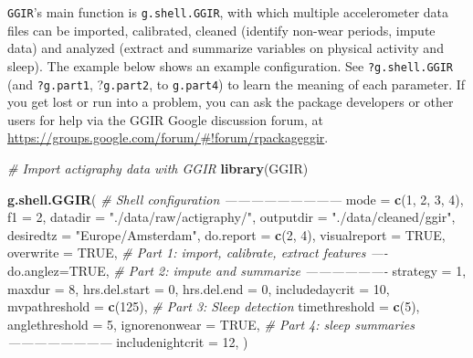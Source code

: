 \documentclass[]{book}
\newenvironment{Shaded}{\begin{snugshade}}{\end{snugshade}}
\newcommand{\KeywordTok}[1]{\textcolor[rgb]{0.13,0.29,0.53}{\textbf{#1}}}
\newcommand{\DataTypeTok}[1]{\textcolor[rgb]{0.13,0.29,0.53}{#1}}
\newcommand{\DecValTok}[1]{\textcolor[rgb]{0.00,0.00,0.81}{#1}}
\newcommand{\StringTok}[1]{\textcolor[rgb]{0.31,0.60,0.02}{#1}}
\newcommand{\CommentTok}[1]{\textcolor[rgb]{0.56,0.35,0.01}{\textit{#1}}}
\newcommand{\OtherTok}[1]{\textcolor[rgb]{0.56,0.35,0.01}{#1}}
\newcommand{\NormalTok}[1]{#1}
\begin{document}
\texttt{GGIR}'s main function is \texttt{g.shell.GGIR}, with which
multiple accelerometer data files can be imported, calibrated, cleaned
(identify non-wear periods, impute data) and analyzed (extract and
summarize variables on physical activity and sleep). The example below
shows an example configuration. See \texttt{?g.shell.GGIR} (and
\texttt{?g.part1}, ?\texttt{g.part2}, to \texttt{g.part4}) to learn the
meaning of each parameter. If you get lost or run into a problem, you
can ask the package developers or other users for help via the GGIR
Google discussion forum, at
\url{https://groups.google.com/forum/\#!forum/rpackageggir}.

\begin{Shaded}
\begin{Highlighting}[]
\CommentTok{# Import actigraphy data with GGIR}
\KeywordTok{library}\NormalTok{(GGIR)}

\KeywordTok{g.shell.GGIR}\NormalTok{(}
  \CommentTok{# Shell configuration ---------------------------}
  \DataTypeTok{mode =} \KeywordTok{c}\NormalTok{(}\DecValTok{1}\NormalTok{, }\DecValTok{2}\NormalTok{, }\DecValTok{3}\NormalTok{, }\DecValTok{4}\NormalTok{), }\DataTypeTok{f1 =} \DecValTok{2}\NormalTok{,}
  \DataTypeTok{datadir =} \StringTok{"./data/raw/actigraphy/"}\NormalTok{, }
  \DataTypeTok{outputdir =} \StringTok{"./data/cleaned/ggir"}\NormalTok{,}
  \DataTypeTok{desiredtz =} \StringTok{"Europe/Amsterdam"}\NormalTok{,}
  \DataTypeTok{do.report =} \KeywordTok{c}\NormalTok{(}\DecValTok{2}\NormalTok{, }\DecValTok{4}\NormalTok{), }\DataTypeTok{visualreport =} \OtherTok{TRUE}\NormalTok{,}
  \DataTypeTok{overwrite =} \OtherTok{TRUE}\NormalTok{,}
  \CommentTok{# Part 1: import, calibrate, extract features ----}
  \DataTypeTok{do.anglez=}\OtherTok{TRUE}\NormalTok{,}
  \CommentTok{# Part 2: impute and summarize -------------------}
  \DataTypeTok{strategy =} \DecValTok{1}\NormalTok{, }\DataTypeTok{maxdur =} \DecValTok{8}\NormalTok{,}
  \DataTypeTok{hrs.del.start =} \DecValTok{0}\NormalTok{, }\DataTypeTok{hrs.del.end =} \DecValTok{0}\NormalTok{,}
  \DataTypeTok{includedaycrit =} \DecValTok{10}\NormalTok{, }\DataTypeTok{mvpathreshold =} \KeywordTok{c}\NormalTok{(}\DecValTok{125}\NormalTok{), }
  \CommentTok{# Part 3: Sleep detection}
  \DataTypeTok{timethreshold =} \KeywordTok{c}\NormalTok{(}\DecValTok{5}\NormalTok{), }\DataTypeTok{anglethreshold =} \DecValTok{5}\NormalTok{,}
  \DataTypeTok{ignorenonwear =} \OtherTok{TRUE}\NormalTok{,}
  \CommentTok{# Part 4: sleep summaries ------------------------}
  \DataTypeTok{includenightcrit =} \DecValTok{12}\NormalTok{,}
\NormalTok{)}
\end{Highlighting}
\end{Shaded}
\end{document}
